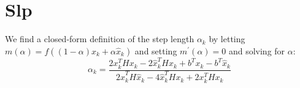 \section{Slp}
We find a closed-form definition of the step length $\alpha_k$ by letting
$m(\alpha) = f((1-\alpha) x_k + \alpha \hat{x}_k)$ and setting
$m^\prime(\alpha) = 0$ and solving for $\alpha$:
\[
\alpha_k = \frac{
                2x_k^T H x_k
                - 2\hat{x}_k^T H x_k
                + b^T x_k - b^T \hat{x}_k
                }{
                  2\hat{x}_k^T H \hat{x}_k
                - 4\hat{x}_k^T H x_k
                + 2x_k^T H x_k
                }
\]

